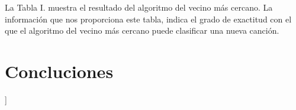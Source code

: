 \documentclass[conference]{IEEEtran}
\begin{document}
La Tabla I. muestra el resultado del algoritmo del vecino más cercano. La información que nos proporciona este tabla, indica el grado de exactitud con el que el algoritmo del vecino más cercano puede clasificar una nueva canción. \\

\section{Concluciones}

\begin{thebibliography}{1}
\item [[1]] %
\end{thebibliography}
\end{document}
